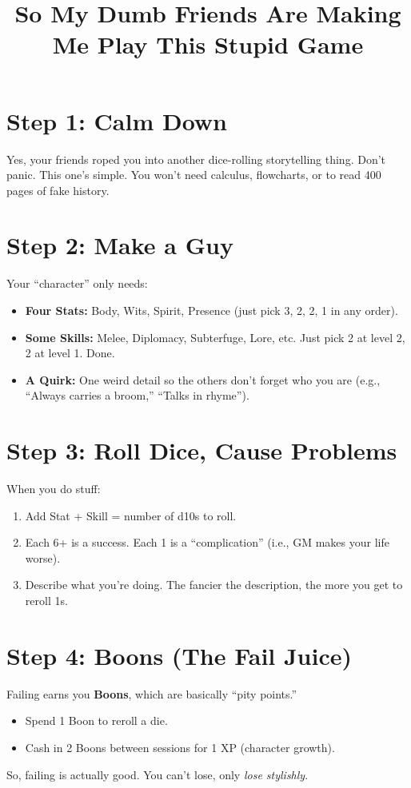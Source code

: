 \documentclass[11pt]{article}
\title{So My Dumb Friends Are Making Me Play This Stupid Game}
\date{}
\begin{document}
\maketitle

\section*{Step 1: Calm Down}
Yes, your friends roped you into another dice-rolling storytelling thing. Don’t panic. This one’s simple. You won’t need calculus, flowcharts, or to read 400 pages of fake history.  

\section*{Step 2: Make a Guy}
Your “character” only needs:  
\begin{itemize}[noitemsep]
    \item \textbf{Four Stats:} Body, Wits, Spirit, Presence (just pick 3, 2, 2, 1 in any order).  
    \item \textbf{Some Skills:} Melee, Diplomacy, Subterfuge, Lore, etc. Just pick 2 at level 2, 2 at level 1. Done.  
    \item \textbf{A Quirk:} One weird detail so the others don’t forget who you are (e.g., “Always carries a broom,” “Talks in rhyme”).  
\end{itemize}

\section*{Step 3: Roll Dice, Cause Problems}
When you do stuff:  
\begin{enumerate}[noitemsep]
    \item Add Stat + Skill = number of d10s to roll.  
    \item Each 6+ is a success. Each 1 is a “complication” (i.e., GM makes your life worse).  
    \item Describe what you’re doing. The fancier the description, the more you get to reroll 1s.  
\end{enumerate}

\section*{Step 4: Boons (The Fail Juice)}
Failing earns you \textbf{Boons}, which are basically “pity points.”  
\begin{itemize}[noitemsep]
    \item Spend 1 Boon to reroll a die.  
    \item Cash in 2 Boons between sessions for 1 XP (character growth).  
\end{itemize}
So, failing is actually good. You can’t lose, only \emph{lose stylishly}.  
\end{document}
